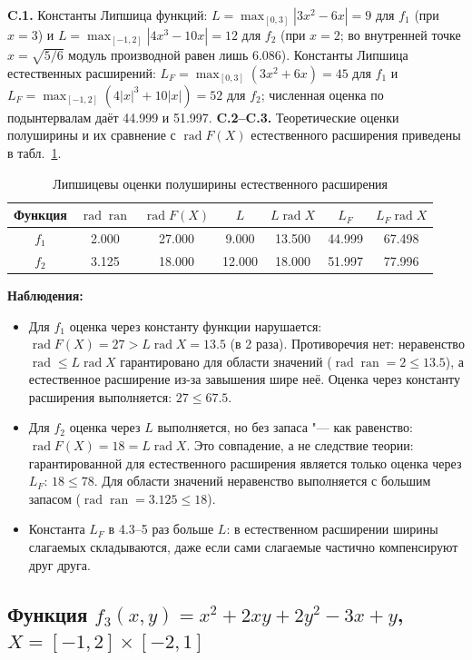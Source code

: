 \documentclass[12pt,a4paper]{article}
\newcommand{\ran}{\operatorname{ran}}
\newcommand{\rad}{\operatorname{rad}}
\begin{document}
\textbf{C.1.} Константы Липшица функций: $L=\max_{[0,3]}|3x^2-6x|=9$ для $f_1$ (при $x=3$) и $L=\max_{[-1,2]}|4x^3-10x|=12$ для $f_2$ (при $x=2$; во внутренней точке $x=\sqrt{5/6}$ модуль производной равен лишь $6.086$). Константы Липшица естественных расширений: $L_F=\max_{[0,3]}(3x^2+6x)=45$ для $f_1$ и $L_F=\max_{[-1,2]}(4|x|^3+10|x|)=52$ для $f_2$; численная оценка по подынтервалам даёт 44.999 и 51.997.
\textbf{C.2--C.3.} Теоретические оценки полуширины и их сравнение с $\rad F(X)$ естественного расширения приведены в табл.~\ref{tab:lip}.

\begin{table}[H]
\centering
\begin{tabular}{|c|c|c|c|c|c|c|}
\hline
Функция & $\rad\ran$ & $\rad F(X)$ & $L$ & $L\rad X$ & $L_F$ & $L_F\rad X$ \\
\hline
$f_1$ & 2.000 & 27.000 & 9.000 & 13.500 & 44.999 & 67.498 \\
$f_2$ & 3.125 & 18.000 & 12.000 & 18.000 & 51.997 & 77.996 \\
\hline
\end{tabular}
\caption{Липшицевы оценки полуширины естественного расширения}
\label{tab:lip}
\end{table}

\textbf{Наблюдения:}
\begin{itemize}
\item Для $f_1$ оценка через константу функции нарушается: $\rad F(X)=27>L\rad X=13.5$ (в 2 раза). Противоречия нет: неравенство $\rad\le L\rad X$ гарантировано для области значений ($\rad\ran=2\le13.5$), а естественное расширение из-за завышения шире неё. Оценка через константу расширения выполняется: $27\le67.5$.
\item Для $f_2$ оценка через $L$ выполняется, но без запаса "--- как равенство: $\rad F(X)=18=L\rad X$. Это совпадение, а не следствие теории: гарантированной для естественного расширения является только оценка через $L_F$: $18\le78$. Для области значений неравенство выполняется с большим запасом ($\rad\ran=3.125\le18$).
\item Константа $L_F$ в 4.3--5 раз больше $L$: в естественном расширении ширины слагаемых складываются, даже если сами слагаемые частично компенсируют друг друга.
\end{itemize}

\subsection*{Функция $f_3(x,y)=x^2+2xy+2y^2-3x+y$, $X=[-1,2]\times[-2,1]$}
\end{document}
